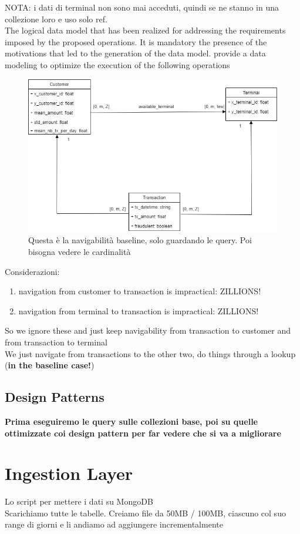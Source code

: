 \documentclass[letterpaper,11pt]{article}
\begin{document}
NOTA: i dati di terminal non sono mai acceduti, quindi se ne stanno in una collezione loro e uso solo ref.
\\
The logical data model that has been realized for addressing the requirements imposed by the proposed operations. It is mandatory the presence of the motivations that led to the generation of the data model.
provide a data modeling to optimize the execution of the following operations
\begin{figure}[ht] 
        \centering \includegraphics[width=0.9\columnwidth]{images/MongoBaselineNavigability.png}
        \caption{\label{fig1}Questa è la navigabilità baseline, solo guardando le query. Poi bisogna vedere le cardinalità}
\end{figure}
Considerazioni:
\begin{enumerate}
    \item navigation from customer to transaction is impractical: ZILLIONS!
    \item navigation from terminal to transaction is impractical: ZILLIONS!
\end{enumerate}
So we ignore these and just keep navigability from transaction to customer and from transaction to terminal\\
We just navigate from transactions to the other two, do things through a lookup (\textbf{in the baseline case!})
\\
\subsection{Design Patterns}
\textbf{Prima eseguiremo le query sulle collezioni base, poi su quelle ottimizzate coi design pattern per far vedere che si va a migliorare}

\section{Ingestion Layer}
Lo script per mettere i dati su MongoDB\\
Scarichiamo tutte le tabelle. Creiamo file da 50MB / 100MB, ciascuno col suo range di giorni e li andiamo ad aggiungere incrementalmente
\end{document}
